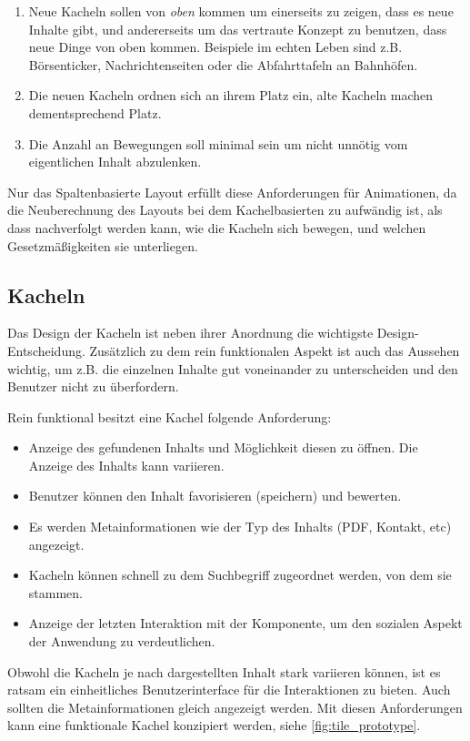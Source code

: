 \documentclass[12pt,twoside]{book}
\begin{document}
\begin{enumerate}
  \item Neue Kacheln sollen von \textit{oben} kommen um einerseits zu zeigen, dass es neue Inhalte gibt, und andererseits um das vertraute Konzept zu benutzen, dass neue Dinge von oben kommen. Beispiele im echten Leben sind z.B. Börsenticker, Nachrichtenseiten oder die Abfahrttafeln an Bahnhöfen.

  \item Die neuen Kacheln ordnen sich an ihrem Platz ein, alte Kacheln machen dementsprechend Platz.
  \item Die Anzahl an Bewegungen soll minimal sein um nicht unnötig vom eigentlichen Inhalt abzulenken.
\end{enumerate}

Nur das Spaltenbasierte Layout erfüllt diese Anforderungen für Animationen, da die Neuberechnung des Layouts bei dem Kachelbasierten zu aufwändig ist, als dass nachverfolgt werden kann, wie die Kacheln sich bewegen, und welchen Gesetzmäßigkeiten sie unterliegen.

\subsection{Kacheln}\label{sec:tiles}

Das Design der Kacheln ist neben ihrer Anordnung die wichtigste Design-Entscheidung. Zusätzlich zu dem rein funktionalen Aspekt ist auch das Aussehen wichtig, um z.B. die einzelnen Inhalte gut voneinander zu unterscheiden und den Benutzer nicht zu überfordern.

Rein funktional besitzt eine Kachel folgende Anforderung:

\begin{itemize}
  \item Anzeige des gefundenen Inhalts und Möglichkeit diesen zu öffnen. Die Anzeige des Inhalts kann variieren.
  \item Benutzer können den Inhalt favorisieren (speichern) und bewerten.
  \item Es werden Metainformationen wie der Typ des Inhalts (PDF, Kontakt, etc) angezeigt.
  \item Kacheln können schnell zu dem Suchbegriff zugeordnet werden, von dem sie stammen.
  \item Anzeige der letzten Interaktion mit der Komponente, um den sozialen Aspekt der Anwendung zu verdeutlichen.
\end{itemize}

Obwohl die Kacheln je nach dargestellten Inhalt stark variieren können, ist es ratsam ein einheitliches Benutzerinterface für die Interaktionen zu bieten. Auch sollten die Metainformationen gleich angezeigt werden.
Mit diesen Anforderungen kann eine funktionale Kachel konzipiert werden, siehe \ref{fig:tile_prototype}.
\end{document}
